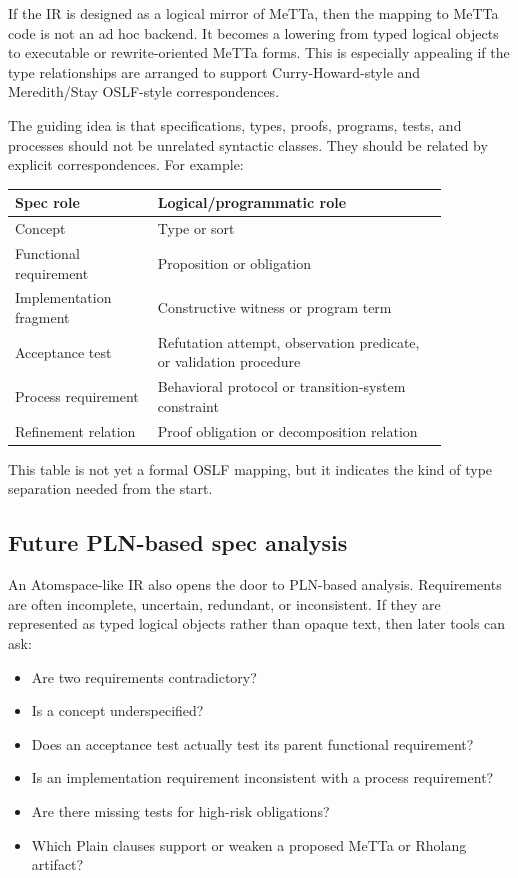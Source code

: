 \documentclass[11pt]{article}
\begin{document}
If the IR is designed as a logical mirror of MeTTa, then the mapping to MeTTa
code is not an ad hoc backend. It becomes a lowering from typed logical objects
to executable or rewrite-oriented MeTTa forms. This is especially appealing if
the type relationships are arranged to support Curry-Howard-style and
Meredith/Stay OSLF-style correspondences.

The guiding idea is that specifications, types, proofs, programs, tests, and
processes should not be unrelated syntactic classes. They should be related by
explicit correspondences. For example:

\begin{center}
\begin{tabular}{>{\raggedright\arraybackslash}p{0.28\linewidth} >{\raggedright\arraybackslash}p{0.58\linewidth}}
Spec role & Logical/programmatic role \\
\hline
Concept & Type or sort \\
Functional requirement & Proposition or obligation \\
Implementation fragment & Constructive witness or program term \\
Acceptance test & Refutation attempt, observation predicate, or validation procedure \\
Process requirement & Behavioral protocol or transition-system constraint \\
Refinement relation & Proof obligation or decomposition relation \\
\end{tabular}
\end{center}

This table is not yet a formal OSLF mapping, but it indicates the kind of type
separation needed from the start.

\subsection{Future PLN-based spec analysis}

An Atomspace-like IR also opens the door to PLN-based analysis. Requirements are
often incomplete, uncertain, redundant, or inconsistent. If they are represented
as typed logical objects rather than opaque text, then later tools can ask:

\begin{itemize}[nosep]
\item Are two requirements contradictory?
\item Is a concept underspecified?
\item Does an acceptance test actually test its parent functional requirement?
\item Is an implementation requirement inconsistent with a process requirement?
\item Are there missing tests for high-risk obligations?
\item Which Plain clauses support or weaken a proposed MeTTa or Rholang artifact?
\end{itemize}
\end{document}
